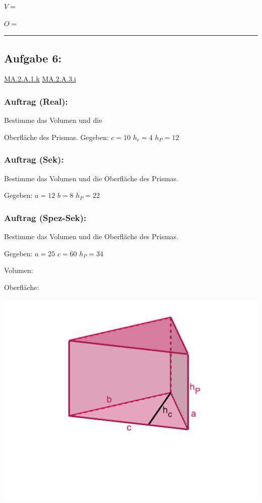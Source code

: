 \documentclass[
  letterpaper,
  DIV=11]{scrartcl}
\begin{document}
\(V =\)

\(O =\)

\begin{center}\rule{0.5\linewidth}{0.5pt}\end{center}

\subsection{Aufgabe 6:}\label{aufgabe-6}

\href{https://be.lehrplan.ch/101bVuh6VdBgHN5Cz8e8GNuD4cNJh6x2p}{MA.2.A.1.k}
\href{https://be.lehrplan.ch/101hY2pesFLB3JJ6vSRYcnGYRen9Wuyfy}{MA.2.A.3.i}

\subsubsection{Auftrag (Real):}\label{auftrag-real}

Bestimme das Volumen und die

Oberfläche des Prismas. Gegeben: \(c = 10\) \(h_c = 4\) \(h_P = 12\)

\subsubsection{Auftrag (Sek):}\label{auftrag-sek}

Bestimme das Volumen und die Oberfläche des Prismas.

Gegeben: \(a = 12\) \(b = 8\) \(h_P = 22\)

\subsubsection{Auftrag (Spez-Sek):}\label{auftrag-spez-sek}

Bestimme das Volumen und die Oberfläche des Prismas.

Gegeben: \(a = 25\) \(c= 60\) \(h_P = 34\)

Volumen:

Oberfläche:

\includegraphics{images/geogebra-export_6.png}
\end{document}
